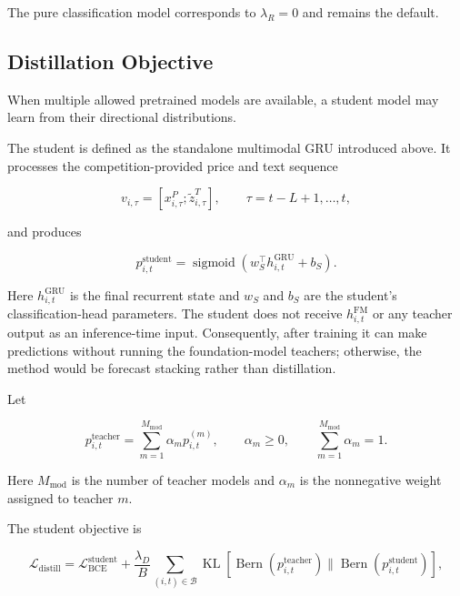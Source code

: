 \documentclass[11pt]{article}
\newcommand{\sigmoid}{\operatorname{sigmoid}}
\begin{document}
The pure classification model corresponds to $\lambda_R=0$ and remains the
default.

\subsection{Distillation Objective}

When multiple allowed pretrained models are available, a student model may
learn from their directional distributions.

The student is defined as the standalone multimodal GRU introduced above. It
processes the competition-provided price and text sequence

\begin{equation}
v_{i,\tau}
=
\left[
x^P_{i,\tau};
\widetilde z^T_{i,\tau}
\right],
\qquad
\tau=t-L+1,\ldots,t,
\end{equation}

and produces

\begin{equation}
p^{\mathrm{student}}_{i,t}
=
\sigmoid\left(
w_S^\top h^{\mathrm{GRU}}_{i,t}+b_S
\right).
\end{equation}

Here $h^{\mathrm{GRU}}_{i,t}$ is the final recurrent state and $w_S$ and
$b_S$ are the student's classification-head parameters. The student does not
receive $h^{\mathrm{FM}}_{i,t}$ or any teacher output as an inference-time
input. Consequently, after training it can make predictions without running
the foundation-model teachers; otherwise, the method would be forecast
stacking rather than distillation.

Let

\begin{equation}
p^{\mathrm{teacher}}_{i,t}
=
\sum_{m=1}^{M_{\mathrm{mod}}}
\alpha_m p^{(m)}_{i,t},
\qquad
\alpha_m\geq 0,
\qquad
\sum_{m=1}^{M_{\mathrm{mod}}} \alpha_m=1.
\end{equation}

Here $M_{\mathrm{mod}}$ is the number of teacher models and $\alpha_m$ is the
nonnegative weight assigned to teacher $m$.

The student objective is

\begin{equation}
\mathcal{L}_{\mathrm{distill}}
=
\mathcal{L}^{\mathrm{student}}_{\mathrm{BCE}}
+
\frac{\lambda_D}{B}
\sum_{(i,t)\in\mathcal B}
\operatorname{KL}
\left[
\operatorname{Bern}\left(p^{\mathrm{teacher}}_{i,t}\right)
\parallel
\operatorname{Bern}\left(p^{\mathrm{student}}_{i,t}\right)
\right],
\end{equation}
\end{document}

